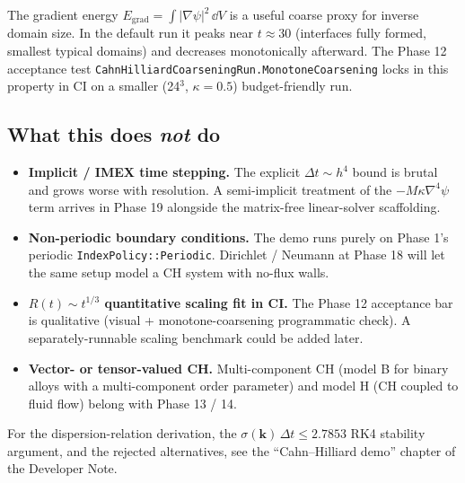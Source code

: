 The gradient energy
\(E_{\text{grad}} = \int |\nabla\psi|^2\,\dd V\) is a useful coarse
proxy for inverse domain size. In the default run it peaks near
\(t\approx 30\) (interfaces fully formed, smallest typical domains)
and decreases monotonically afterward. The Phase 12 acceptance test
\passthrough{\lstinline!CahnHilliardCoarseningRun.MonotoneCoarsening!}
locks in this property in CI on a smaller (24\(^3\), \(\kappa=0.5\))
budget-friendly run.

\subsection{What this does \emph{not} do}\label{phase12-not-do}

\begin{itemize}
\tightlist
\item
  \textbf{Implicit / IMEX time stepping.} The explicit
  \(\Delta t \sim h^4\) bound is brutal and grows worse with
  resolution. A semi-implicit treatment of the
  \(-M\kappa\nabla^4\psi\) term arrives in Phase 19 alongside the
  matrix-free linear-solver scaffolding.
\item
  \textbf{Non-periodic boundary conditions.} The demo runs purely on
  Phase 1's periodic \passthrough{\lstinline!IndexPolicy::Periodic!}.
  Dirichlet / Neumann at Phase 18 will let the same setup model a CH
  system with no-flux walls.
\item
  \textbf{\(R(t)\sim t^{1/3}\) quantitative scaling fit in CI.} The
  Phase 12 acceptance bar is qualitative (visual + monotone-coarsening
  programmatic check). A separately-runnable scaling benchmark could
  be added later.
\item
  \textbf{Vector- or tensor-valued CH.} Multi-component CH (model B
  for binary alloys with a multi-component order parameter) and model
  H (CH coupled to fluid flow) belong with Phase 13 / 14.
\end{itemize}

For the dispersion-relation derivation, the
\(\sigma(\mathbf k)\,\Delta t\le 2.7853\) RK4 stability argument, and
the rejected alternatives, see the ``Cahn--Hilliard demo'' chapter of
the Developer Note.
